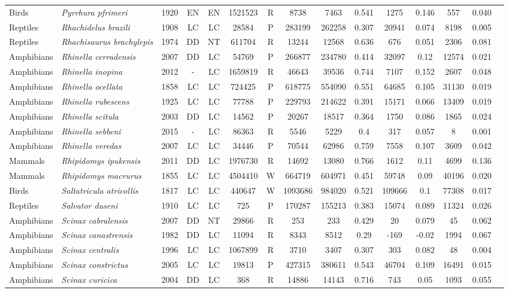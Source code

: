 \documentclass[12pt,openright,oneside,a4paper,english]{abntex2}
\begin{document}
\begin{landscape}
\begin{longtable}{llccccccccccccc}
		Birds&\textit{Pyrrhura pfrimeri}&1920&EN&EN&1521523&R&8738&7463&0.541&1275&0.146&557&0.040\\
		Reptiles&\textit{Rhachidelus brazili}&1908&LC&LC&28584&P&283199&262258&0.307&20941&0.074&8198&0.005\\
		Reptiles&\textit{Rhachisaurus brachylepis}&1974&DD&NT&611704&R&13244&12568&0.636&676&0.051&2306&0.081\\
		Amphibians&\textit{Rhinella cerradensis}&2007&DD&LC&54769&P&266877&234780&0.414&32097&0.12&12574&0.021\\
		Amphibians&\textit{Rhinella inopina}&2012&-&LC&1659819&R&46643&39536&0.744&7107&0.152&2607&0.048\\
		Amphibians&\textit{Rhinella ocellata}&1858&LC&LC&724425&P&618775&554090&0.551&64685&0.105&31130&0.019\\
		Amphibians&\textit{Rhinella rubescens}&1925&LC&LC&77788&P&229793&214622&0.391&15171&0.066&13409&0.019\\
		Amphibians&\textit{Rhinella scitula}&2003&DD&LC&14562&P&20267&18517&0.364&1750&0.086&1865&0.024\\
		Amphibians&\textit{Rhinella sebbeni}&2015&-&LC&86363&R&5546&5229&0.4&317&0.057&8&0.001\\
		Amphibians&\textit{Rhinella veredas}&2007&LC&LC&34446&P&70544&62986&0.759&7558&0.107&3609&0.042\\
		Mammals&\textit{Rhipidomys ipukensis}&2011&DD&LC&1976730&R&14692&13080&0.766&1612&0.11&4699&0.136\\
		Mammals&\textit{Rhipidomys macrurus}&1855&LC&LC&4504410&W&664719&604971&0.451&59748&0.09&40196&0.020\\
		Birds&\textit{Saltatricula atricollis}&1817&LC&LC&440647&W&1093686&984020&0.521&109666&0.1&77308&0.017\\
		Reptiles&\textit{Salvator duseni}&1910&LC&LC&725&P&170287&155213&0.383&15074&0.089&11324&0.026\\
		Amphibians&\textit{Scinax cabralensis}&2007&DD&NT&29866&R&253&233&0.429&20&0.079&45&0.062\\
		Amphibians&\textit{Scinax canastrensis}&1982&DD&LC&11094&R&8343&8512&0.29&-169&-0.02&1994&0.067\\
		Amphibians&\textit{Scinax centralis}&1996&LC&LC&1067899&R&3710&3407&0.307&303&0.082&48&0.004\\
		Amphibians&\textit{Scinax constrictus}&2005&LC&LC&19813&P&427315&380611&0.543&46704&0.109&16491&0.015\\
		Amphibians&\textit{Scinax curicica}&2004&DD&LC&368&R&14886&14143&0.716&743&0.05&1093&0.055\\

\end{longtable}
\end{landscape}
\end{document}
